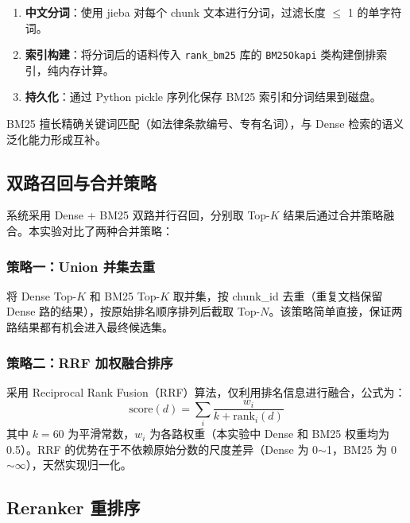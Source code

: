 \documentclass[12pt, a4paper]{article}
\begin{document}
\begin{enumerate}[leftmargin=2em]
    \item \textbf{中文分词}：使用 jieba 对每个 chunk 文本进行分词，过滤长度 $\leq$ 1 的单字符词。
    \item \textbf{索引构建}：将分词后的语料传入 \texttt{rank\_bm25} 库的 \texttt{BM25Okapi} 类构建倒排索引，纯内存计算。
    \item \textbf{持久化}：通过 Python pickle 序列化保存 BM25 索引和分词结果到磁盘。
\end{enumerate}

BM25 擅长精确关键词匹配（如法律条款编号、专有名词），与 Dense 检索的语义泛化能力形成互补。

\subsection{双路召回与合并策略}

系统采用 Dense + BM25 双路并行召回，分别取 Top-$K$ 结果后通过合并策略融合。本实验对比了两种合并策略：

\subsubsection{策略一：Union 并集去重}

将 Dense Top-$K$ 和 BM25 Top-$K$ 取并集，按 chunk\_id 去重（重复文档保留 Dense 路的结果），按原始排名顺序排列后截取 Top-$N$。该策略简单直接，保证两路结果都有机会进入最终候选集。

\subsubsection{策略二：RRF 加权融合排序}

采用 Reciprocal Rank Fusion（RRF）算法，仅利用排名信息进行融合，公式为：
\begin{equation}
\text{score}(d) = \sum_{i} \frac{w_i}{k + \text{rank}_i(d)}
\end{equation}
其中 $k=60$ 为平滑常数，$w_i$ 为各路权重（本实验中 Dense 和 BM25 权重均为 0.5）。RRF 的优势在于不依赖原始分数的尺度差异（Dense 为 0$\sim$1，BM25 为 0$\sim \infty$），天然实现归一化。

\subsection{Reranker 重排序}
\end{document}
